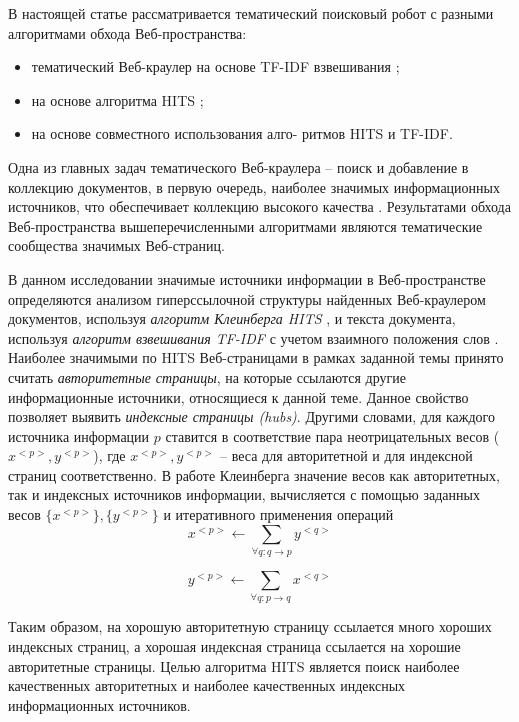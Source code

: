 В настоящей статье рассматривается тематический поисковый робот с разными алгоритмами обхода Веб-пространства:
\begin{itemize}
	\item тематический Веб-краулер на основе TF-IDF взвешивания \cite{Nekrestyanov};
	\item на основе алгоритма HITS \cite{BlekanovBondarenko2};
	\item на основе совместного использования алго- ритмов HITS и TF-IDF.
\end{itemize}

Одна из главных задач тематического Веб-краулера -- поиск и добавление в коллекцию документов, в первую очередь, наиболее значимых информационных источников, что обеспечивает коллекцию высокого качества \cite{ArasuChoGM}. Результатами обхода Веб-пространства вышеперечисленными алгоритмами являются тематические сообщества \cite{GibsonKleinbergRaghavan} значимых Веб-страниц.

В данном исследовании значимые источники информации в Веб-пространстве определяются анализом гиперссылочной структуры найденных Веб-краулером документов, используя \textit{алгоритм Клеинберга HITS} \cite{Kleinberg}, и текста документа, используя \textit{алгоритм взвешивания TF-IDF} \cite{SinghalKaszkiel} с учетом взаимного положения слов \cite{Gubin}. Наиболее значимыми по HITS Веб-страницами в рамках заданной темы принято считать \textit{авторитетные страницы}, на которые ссылаются другие информационные источники, относящиеся к данной теме. Данное свойство позволяет выявить \textit{индексные страницы (hubs)}. Другими словами, для каждого источника информации \(p\) ставится в соответствие пара неотрицательных весов (\(x^{<p>}, y^{<p>}\)), где \(x^{<p>}, y^{<p>}\) -- веса для авторитетной и для индексной страниц соответственно. В работе Клеинберга \cite{Kleinberg} значение весов как авторитетных, так и индексных источников информации, вычисляется с помощью заданных весов \(\{x^{<p>}\}, \{y^{<p>}\}\) и итеративного применения операций
\begin{equation}
	\label{eqn:1}
	x^{<p>} \leftarrow \sum_{\forall q: q \rightarrow p} y^{<q>}
\end{equation}

\begin{equation}
	\label{eqn:2}
	y^{<p>} \leftarrow \sum_{\forall q: p \rightarrow q} x^{<q>}
\end{equation}

Таким образом, на хорошую авторитетную страницу ссылается много хороших индексных страниц, а хорошая индексная страница ссылается на хорошие авторитетные страницы. Целью алгоритма HITS является поиск наиболее качественных авторитетных и наиболее качественных индексных информационных источников.

